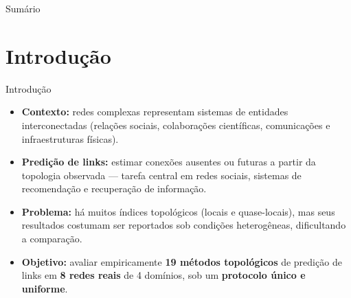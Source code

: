 \documentclass[aspectratio=169,11pt]{beamer}
\providecommand{\EspacoAposTitulo}{\vspace*{0.93cm}}
\providecommand{\EspacoEntreTopicos}{0.29cm}
\newcommand{\dest}[1]{\textcolor{modTeal}{\textbf{#1}}}
\begin{document}
\Capa

\MostrarMolduraSemNumerotrue
\begin{frame}[t,noframenumbering]{Sumário}

  \EspacoAposTitulo

  {\small
  \tableofcontents[hideallsubsections]}

\end{frame}
\MostrarMolduraSemNumerofalse

\section{Introdução}

\begin{frame}[t]{Introdução}

  \EspacoAposTitulo

  \begin{itemize}
    \setlength{\itemsep}{\EspacoEntreTopicos}

    \item \textbf{Contexto:}
    redes complexas representam sistemas de entidades interconectadas
    (relações sociais, colaborações científicas, comunicações e
    infraestruturas físicas).

    \item \textbf{Predição de links:}
    estimar conexões ausentes ou futuras a partir da topologia observada
    — tarefa central em redes sociais, sistemas de recomendação e
    recuperação de informação.

    \item \textbf{Problema:}
    há muitos índices topológicos (locais e quase-locais), mas seus
    resultados costumam ser reportados sob condições heterogêneas,
    dificultando a comparação.

    \item \textbf{Objetivo:}
    avaliar empiricamente \dest{19 métodos topológicos} de predição de
    links em \dest{8 redes reais} de 4 domínios, sob um
    \dest{protocolo único e uniforme}.

  \end{itemize}

\end{frame}
\end{document}
